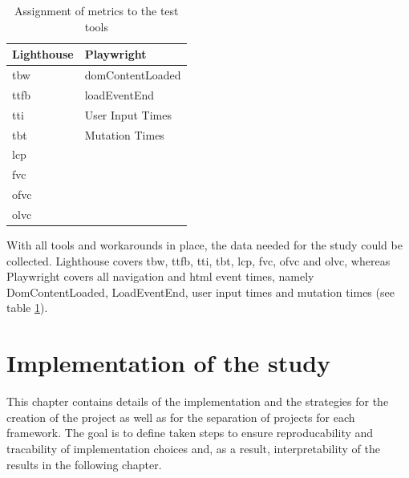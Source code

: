 \documentclass[a4paper, 12pt]{article}
\begin{document}
\begin{table}[h]
  \begin{center}
    \begin{tabular}{|l|l|}
      \hline
      \textbf{Lighthouse} & \textbf{Playwright} \\ \hline
      \acrfull{tbw}       & domContentLoaded    \\ \hline
      \acrfull{ttfb}      & loadEventEnd        \\ \hline
      \acrfull{tti}       & User Input Times    \\ \hline
      \acrfull{tbt}       & Mutation Times      \\ \hline
      \acrfull{lcp}       &                     \\ \hline
      \acrfull{fvc}       &                     \\ \hline
      \acrfull{ofvc}      &                     \\ \hline
      \acrfull{olvc}      &                     \\ \hline
    \end{tabular}
  \end{center}
  \caption{Assignment of metrics to the test tools}
  \label{tab:metricassignment}
\end{table}

With all tools and workarounds in place, the data needed for the study could be collected.
Lighthouse covers \acrshort{tbw}, \acrshort{ttfb}, \acrshort{tti}, \acrshort{tbt}, \acrshort{lcp}, \acrshort{fvc}, \acrshort{ofvc} and \acrshort{olvc}, whereas Playwright covers all navigation and \acrshort{html} event times, namely DomContentLoaded, LoadEventEnd, user input times and mutation times (see table \ref{tab:metricassignment}).

\section{Implementation of the study}\label{sec:implementation} 
% 

This chapter contains details of the implementation and the strategies for the creation of the project as well as for the separation of projects for each framework.
The goal is to define taken steps to ensure reproducability and tracability of implementation choices and, as a result, interpretability of the results in the following chapter.
\end{document}
